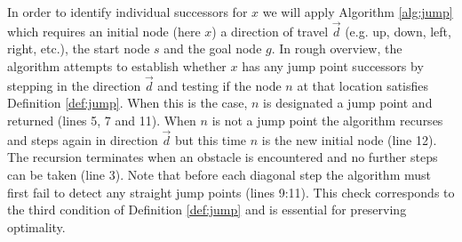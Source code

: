 In order to identify individual successors for $x$ we will apply Algorithm
\ref{alg:jump} which requires an initial node (here $x$) a direction of travel
$\vec{d}$ (e.g. up, down, left, right, etc.), 
the start node $s$ and the goal node $g$.
In rough overview, the algorithm attempts to establish whether $x$ has any 
jump point successors by stepping in the direction $\vec{d}$ and testing
if the node $n$ at that location satisfies Definition \ref{def:jump}.
When this is the case, $n$ is designated a jump point and returned (lines 5, 7
and 11).
When $n$ is not a jump point the algorithm recurses and steps again in direction
$\vec{d}$ but this time $n$ is the new initial node (line 12).
The recursion terminates when an obstacle is encountered and no further
steps can be taken (line 3).
Note that before each diagonal step the algorithm must first 
fail to detect any straight jump points (lines 9:11). 
This check corresponds to the third condition of Definition \ref{def:jump} 
and is essential for preserving optimality.
